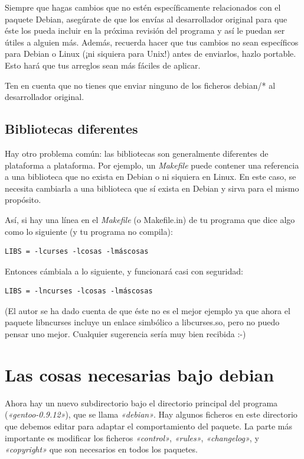 \documentclass[letterpaper,12pt,spanish]{manual}
\begin{document}
Siempre que hagas cambios que no estén específicamente relacionados con el paquete Debian, asegúrate de que los envías al desarrollador original para que éste los pueda incluir en la próxima revisión del programa y así le puedan ser útiles a alguien más. Además, recuerda hacer que tus cambios no sean específicos para Debian o Linux (¡ni siquiera para Unix!) antes de enviarlos, hazlo portable. Esto hará que tus arreglos sean más fáciles de aplicar.

Ten en cuenta que no tienes que enviar ninguno de los ficheros debian/* al desarrollador original.


\subsection{Bibliotecas diferentes}

Hay otro problema común: las bibliotecas son generalmente diferentes de plataforma a plataforma. Por ejemplo, un \emph{Makefile} puede contener una referencia a una biblioteca que no exista en Debian o ni siquiera en Linux. En este caso, se necesita cambiarla a una biblioteca que sí exista en Debian y sirva para el mismo propósito.

Así, si hay una línea en el \emph{Makefile} (o Makefile.in) de tu programa que dice algo como lo siguiente (y tu programa no compila):

\begin{Verbatim}[commandchars=@\[\]]
LIBS = -lcurses -lcosas -lmáscosas
\end{Verbatim}

Entonces cámbiala a lo siguiente, y funcionará casi con seguridad:

\begin{Verbatim}[commandchars=@\[\]]
LIBS = -lncurses -lcosas -lmáscosas
\end{Verbatim}

(El autor se ha dado cuenta de que éste no es el mejor ejemplo ya que ahora el paquete libncurses incluye un enlace simbólico a libcurses.so, pero no puedo pensar uno mejor. Cualquier sugerencia sería muy bien recibida :-)


\section{\textbf{Las cosas necesarias bajo debian}}

Ahora hay un nuevo subdirectorio bajo el directorio principal del programa (\emph{«gentoo-0.9.12»}), que se llama \emph{«debian»}. Hay algunos ficheros en este directorio que debemos editar para adaptar el comportamiento del paquete. La parte más importante es modificar los ficheros \emph{«control»}, \emph{«rules»}, \emph{«changelog»}, y \emph{«copyright»} que son necesarios en todos los paquetes.
\end{document}
